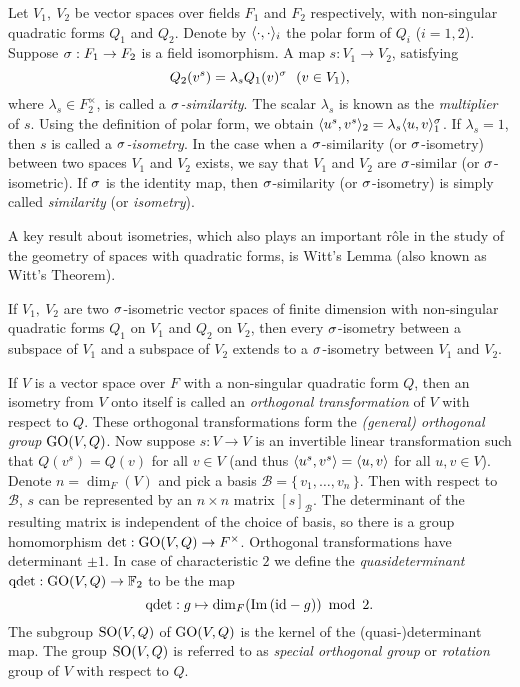 Let $V_1,\ V_2$ be vector spaces over fields $F_1$ and $F_2$ respectively, with non-singular
quadratic forms $Q_1$ and $Q_2$. Denote by $\langle \cdot, \cdot \rangle_i$ the polar form of 
$Q_i$ ($i = 1,2$). Suppose $\sigma : F_1 \rightarrow F_2$ is a field isomorphism. A map
$s : V_1 \rightarrow V_2$, satisfying
\begin{equation}
	\label{eq:similarity}
	Q_2( v^s ) = \lambda_s Q_1(v)^{\sigma}\ \ (v \in V_1),
\end{equation}
where $\lambda_s \in F_2^{\times}$, is called a \textit{$\sigma$-similarity}. The scalar
$\lambda_s$ is known as the \textit{multiplier} of $s$. Using the definition of polar form, 
we obtain $\langle u^s, v^s \rangle_2 = \lambda_s \langle u, v \rangle_1^{\sigma}$. 
If $\lambda_s = 1$, then
$s$ is called a \textit{$\sigma$-isometry}. In the case
when a $\sigma$-similarity (or $\sigma$-isometry) between two spaces $V_1$ and $V_2$ exists, 
we say that $V_1$ and $V_2$ are $\sigma$-similar (or $\sigma$-isometric). 
If $\sigma$ is the identity map, then $\sigma$-similarity (or $\sigma$-isometry) is simply called 
 \textit{similarity} (or \textit{isometry}).

A key result about isometries, which also plays an important r\^{o}le in the study of the geometry
of spaces with quadratic forms, is Witt's Lemma (also known as Witt's Theorem). 

\begin{theorem}
	If $V_1,\ V_2$ are two $\sigma$-isometric 
	vector spaces of finite dimension with non-singular
	quadratic forms $Q_1$ on $V_1$ and $Q_2$ on $V_2$, then every $\sigma$-isometry between a 
	subspace of $V_1$ and a subspace of $V_2$ extends to a \mbox{$\sigma$-isometry}
	between $V_1$ and $V_2$. 
\end{theorem}

If $V$ is a vector space over $F$ 
with a non-singular quadratic form $Q$, then an isometry from $V$ onto
itself is called an \textit{orthogonal transformation} of $V$ with respect to $Q$. These 
orthogonal transformations form the \textit{(general) orthogonal group} $\mathrm{GO}(V,Q)$. Now suppose 
$s : V \rightarrow V$ is an invertible linear transformation such that $Q(v^s) = Q(v)$ for
all $v \in V$ (and thus $\langle u^s, v^s \rangle = \langle u, v \rangle$ for all $u,v \in V$).
Denote $n = \dim_F(V)$ and pick a basis $\mathcal{B} = \{\,v_1,\ldots,v_n\,\}$. 
Then with respect to $\mathcal{B}$, $s$ can be represented by an $n\times n$ matrix
$[s]_{\mathcal{B}}$. The determinant of the resulting matrix is independent of 
the choice of basis, so there is a group homomorphism 
$\det: \mathrm{GO}(V,Q) \rightarrow F^{\times}$. Orthogonal transformations have determinant $\pm 1$.
In case of characteristic $2$ we define the \textit{quasideterminant}
$\mathrm{qdet}:\mathrm{GO}(V,Q) \rightarrow \mathbb{F}_2$ to be the map
\begin{equation}
	\label{eq:qdet}
    \mathrm{qdet}: g \mapsto \dim_F ( \im(\mathrm{id} - g) )\ \operatorname{mod}\ 2.
\end{equation}
The subgroup $\mathrm{SO}(V,Q)$ of $\mathrm{GO}(V,Q)$ is the kernel of the (quasi-)determinant map. The group
$\mathrm{SO}(V,Q)$ is referred to as \textit{special orthogonal group} or \textit{rotation} group
of $V$ with respect to $Q$. 

